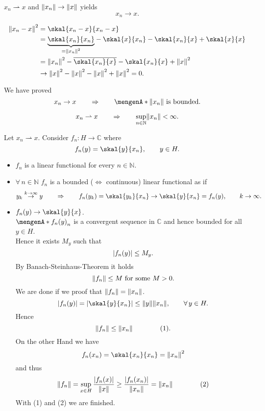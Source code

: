 \begin{satz}
	$x_n \rightharpoonup x$ and $\norm{x_n} \to \norm{x}$ yields
	\[
		x_n \to x.
	\]
\end{satz}
\begin{beweis}
	\begin{align*}
		\norm{x_n-x}^2 &= \skal{x_n -x}{x_n-x} \\
		&= \underset{= \norm{x_n}^2}{\underbrace{\skal{x_n}{x_n}}} - \skal{x}{x_n}- \skal{x_n}{x} + \skal{x}{x} \\
		&= \norm{x_n}^2 - \overline{\skal{x_n}{x}} - \skal{x_n}{x} + \norm{x}^2 \\
		&\to \norm{x}^2 - \norm{x}^2 - \norm{x}^2 + \norm{x}^2 = 0.
	\end{align*}
\end{beweis}

We have proved 
\[
	x_n \to x \qquad \Rightarrow \qquad \set{\norm{x_n}} \text{ is bounded}.
\]

\begin{theorem}
	\[
		x_n \rightharpoonup x \qquad \Rightarrow \qquad \sup_{n \in \mathbb{N}}\norm{x_n} < \infty.
	\]
\end{theorem}
\begin{beweis}
	Let $x_n \rightharpoonup x$. Consider $f_n: H \to \mathbb{C}$ where
	\[
		f_n(y) = \skal{y}{x_n}, \qquad y \in H.
	\]
	\begin{itemize}
		\item $f_n$ is a linear functional for every $n \in \mathbb{N}$.
		\item $\forall\, n \in \mathbb{N}$ $f_n$ is a bounded ($\Leftrightarrow$ continuous) linear functional as if 
		\[
			y_k \stackrel{k \to \infty}{\to }y \qquad \Rightarrow \qquad f_n(y_k) = \skal{y_k}{x_n} \to \skal{y}{x_n} = f_n(y), \qquad k \to \infty.
		\]
		\item $f_n(y) \to \skal{y}{x}$. \\
		$\set{f_n(y)}_n$ is a convergent sequence in $\mathbb{C}$ and hence bounded for all $y \in H$. \\
		Hence it exists $M_y$ such that 
		\[
			\lvert f_n(y)\rvert \leq M_y.
		\]
		By Banach-Steinhaus-Theorem it holds
		\[
			\norm{f_n} \leq M \text{ for some }M >0.
		\]
		We are done if we proof that $\norm{f_n} = \norm{x_n}$.
		\[
			\abs{f_n(y)}= \abs{\skal{y}{x_n}} \leq \norm{y} \norm{x_n}, \qquad \forall\, y \in H.
		\]
		Hence 
		\[
			\norm{f_n} \leq \norm{x_n} \qquad \qquad (1).
		\]
		On the other Hand we have
		\[
			f_n(x_n) = \skal{x_n}{x_n}= \norm{x_n}^2
		\]
		and thus
		\[
			\norm{f_n} = \sup_{x \in H} \frac{\abs{f_n(x)}}{\norm{x}} \geq \frac{\abs{f_n(x_n)}}{\norm{x_n}} = \norm{x_n} \qquad \qquad (2)
		\]
		With (1) and (2) we are finished.
	\end{itemize}
\end{beweis}

